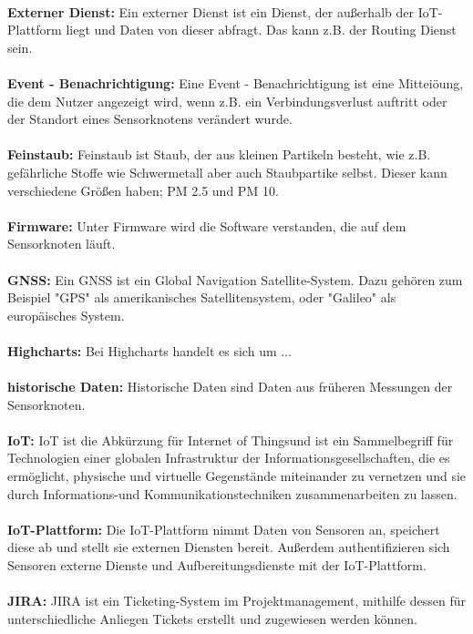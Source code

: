 \\
\textbf{Externer Dienst:} Ein externer Dienst ist ein Dienst, der außerhalb der IoT-Plattform liegt und Daten von dieser abfragt. Das kann z.B. der Routing Dienst sein.\\
\\
\textbf{Event - Benachrichtigung:} Eine Event - Benachrichtigung ist eine Mitteiöung, die dem Nutzer angezeigt wird, wenn z.B. ein Verbindungsverlust auftritt oder der Standort eines Sensorknotens verändert wurde. \\
\\
\textbf{Feinstaub:} Feinstaub ist Staub, der aus kleinen Partikeln besteht, wie z.B. gefährliche Stoffe wie Schwermetall aber auch Staubpartike selbst. Dieser kann verschiedene Größen haben; PM 2.5 und PM 10. \\
\\
\textbf{Firmware:} Unter Firmware wird die Software verstanden, die auf dem Sensorknoten läuft.\\
\\
\textbf{GNSS:} Ein GNSS ist ein Global Navigation Satellite-System. Dazu gehören zum Beispiel "GPS" als amerikanisches Satellitensystem, oder "Galileo" als europäisches System.\\
\\
\textbf{Highcharts:}
Bei Highcharts handelt es sich um ...\\
\\
\textbf{historische Daten:} Historische Daten sind Daten aus früheren Messungen der Sensorknoten.  \\
\\
\textbf{IoT:}
IoT ist die Abkürzung für \dq Internet of Things\dq  und ist ein Sammelbegriff für Technologien einer globalen Infrastruktur der Informationsgesellschaften, die es ermöglicht, physische und virtuelle Gegenstände miteinander zu vernetzen und sie durch Informations-und Kommunikationstechniken zusammenarbeiten zu lassen.\\
\\
\textbf{IoT-Plattform:} Die IoT-Plattform nimmt Daten von Sensoren an, speichert diese ab und stellt sie externen Diensten bereit. Außerdem authentifizieren sich Sensoren externe Dienste und Aufbereitungsdienste mit der IoT-Plattform. \\
\\
\textbf{JIRA:} JIRA ist ein Ticketing-System im Projektmanagement, mithilfe dessen für unterschiedliche Anliegen Tickets erstellt und zugewiesen werden können.  \\
